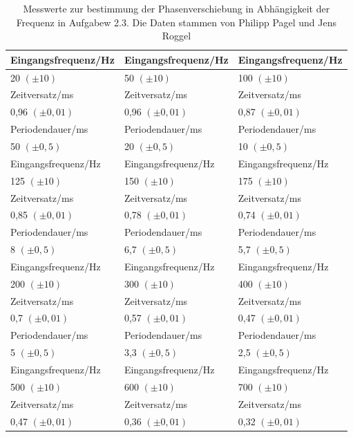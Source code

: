 \documentclass[12pt]{scrartcl}
\begin{document}
\begin{table}[htbp]
\caption{Messwerte zur bestimmung der Phasenverschiebung in Abhängigkeit der Frequenz in Aufgabew 2.3. Die Daten stammen von Philipp Pagel und Jens Roggel}
\begin{center}
\begin{tabular}{|l|l|l|}
\hline
Eingangsfrequenz/Hz & Eingangsfrequenz/Hz & Eingangsfrequenz/Hz \\ \hline
20 $(\pm 10)$ & 50 $(\pm 10)$ & 100 $(\pm 10)$ \\ \hline
Zeitversatz/ms & Zeitversatz/ms & Zeitversatz/ms \\ \hline
0,96  $(\pm 0,01)$ & 0,96  $(\pm 0,01)$ & 0,87  $(\pm 0,01)$ \\ \hline
Periodendauer/ms & Periodendauer/ms & Periodendauer/ms \\ \hline
50 $(\pm 0,5)$ & 20 $(\pm 0,5)$ & 10 $(\pm 0,5)$ \\ \hline \hline
Eingangsfrequenz/Hz & Eingangsfrequenz/Hz & Eingangsfrequenz/Hz \\ \hline
125 $(\pm 10)$ & 150 $(\pm 10)$ & 175 $(\pm 10)$ \\ \hline
Zeitversatz/ms & Zeitversatz/ms & Zeitversatz/ms \\ \hline
0,85  $(\pm 0,01)$ & 0,78  $(\pm 0,01)$ & 0,74  $(\pm 0,01)$ \\ \hline
Periodendauer/ms & Periodendauer/ms & Periodendauer/ms \\ \hline
8 $(\pm 0,5)$ & 6,7 $(\pm 0,5)$ & 5,7 $(\pm 0,5)$ \\ \hline \hline
Eingangsfrequenz/Hz & Eingangsfrequenz/Hz & Eingangsfrequenz/Hz \\ \hline
200 $(\pm 10)$ & 300 $(\pm 10)$ & 400 $(\pm 10)$ \\ \hline
Zeitversatz/ms & Zeitversatz/ms & Zeitversatz/ms \\ \hline
0,7  $(\pm 0,01)$ & 0,57  $(\pm 0,01)$ & 0,47  $(\pm 0,01)$ \\ \hline
Periodendauer/ms & Periodendauer/ms & Periodendauer/ms \\ \hline
5 $(\pm 0,5)$ & 3,3 $(\pm 0,5)$ & 2,5 $(\pm 0,5)$ \\ \hline \hline
Eingangsfrequenz/Hz & Eingangsfrequenz/Hz & Eingangsfrequenz/Hz \\ \hline
500 $(\pm 10)$ & 600 $(\pm 10)$ & 700 $(\pm 10)$ \\ \hline
Zeitversatz/ms & Zeitversatz/ms & Zeitversatz/ms \\ \hline
0,47  $(\pm 0,01)$ & 0,36  $(\pm 0,01)$ & 0,32  $(\pm 0,01)$ \\ \hline

\end{tabular}
\end{center}
\end{table}
\end{document}
